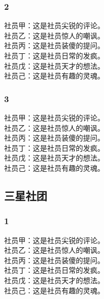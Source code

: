 \documentclass[9pt]{book}
\begin{document}
\begin{multicols}{2}
\subsubsection*{2}
社员甲：这是社员尖锐的评论。\\
社员乙：这是社员惊人的嘲讽。\\
社员丙：这是社员装傻的提问。\\
社员丁：这是社员日常的发疯。\\
社员戊：这是社员天才的想法。\\
社员己：这是社员有趣的灵魂。

\subsubsection*{3}
社员甲：这是社员尖锐的评论。\\
社员乙：这是社员惊人的嘲讽。\\
社员丙：这是社员装傻的提问。\\
社员丁：这是社员日常的发疯。\\
社员戊：这是社员天才的想法。\\
社员己：这是社员有趣的灵魂。

\subsection*{三星社团}
\subsubsection*{1}
社员甲：这是社员尖锐的评论。\\
社员乙：这是社员惊人的嘲讽。\\
社员丙：这是社员装傻的提问。\\
社员丁：这是社员日常的发疯。\\
社员戊：这是社员天才的想法。\\
社员己：这是社员有趣的灵魂。
\end{multicols}
\end{document}
